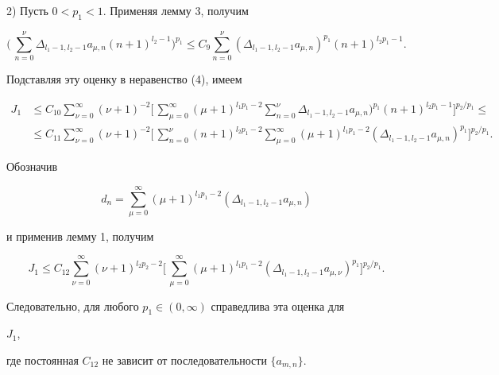  


2) Пусть $0<p_1<1$. Применяя лемму 3, получим 


$$ 


\biggl(\,\sum^\nu_{n=0}\Delta_{l_1-1,l_2-1}a_{\mu,n}(n+1)^{l_2-1} 


\biggr)^{p_1}\le 


%


C_9\sum^\nu_{n=0}(\Delta_{l_1-1,l_2-1}a_{\mu,n})^{p_1} 


(n+1)^{l_2p_1-1}.


$$ 


Подставляя эту оценку в неравенство (4), имеем 


\begin{align*} 


J_1 &\le C_{10}\sum^\infty_{\nu=0}(\nu+1)^{-2}\biggl[\, 


\sum^\infty_{\mu=0}(\mu+1)^{l_1p_1-2} 


\sum^\nu_{n=0}\Delta_{l_1-1,l_2-1}a_{\mu,n})^{p_1}(n+1)^{l_2p_1-1} 


\biggr]^{p_2/p_1}\le \\ 


% 


&\le C_{11}\sum^\infty_{\nu=0}(\nu+1)^{-2}\biggl[\, 


\sum^\nu_{n=0}(n+1)^{l_2p_1-2} 


\sum^\infty_{\mu=0}(\mu+1)^{l_1p_1-2} 


(\Delta_{l_1-1,l_2-1}a_{\mu,n})^{p_1}\biggr]^{p_2/p_1}.


\end{align*} 


Обозначив 


$$ 


d_n=\sum^\infty_{\mu=0}(\mu+1)^{l_1p_1-2} 


(\Delta_{l_1-1,l_2-1}a_{\mu,n})


$$ 


и применив лемму 1, получим 


$$ 


J_1 \le C_{12}\sum^\infty_{\nu=0}(\nu+1)^{l_2p_2-2}\biggl[\, 


\sum^\infty_{\mu=0}(\mu+1)^{l_1p_1-2} 


(\Delta_{l_1-1,l_2-1}a_{\mu,\nu})^{p_1}\biggr]^{p_2/p_1}.


$$ 


Следовательно, для любого $p_1\in(0,\infty)$ справедлива эта оценка для 


$J_1$, 


где постоянная $C_{12}$ не зависит от последовательности $\{a_{m,n}\}$. 


